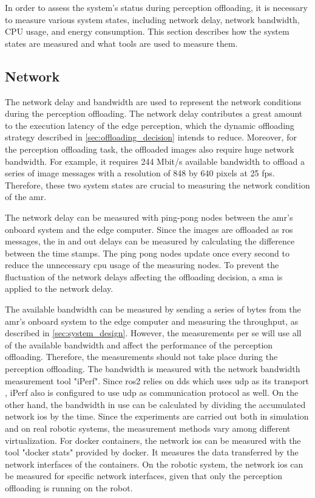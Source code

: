 In order to assess the system's status during perception offloading, it is necessary to measure various system states, including network delay, network bandwidth, CPU usage, and energy consumption. This section describes how the system states are measured and what tools are used to measure them. 

\subsection{Network}

The network delay and bandwidth are used to represent the network conditions during the perception offloading. The network delay contributes a great amount to the execution latency of the edge perception, which the dynamic offloading strategy described in \cref{sec:offloading_decision} intends to reduce. Moreover, for the perception offloading task, the offloaded images also require huge network bandwidth. For example, it requires 244 Mbit/s available bandwidth to offload a series of image messages with a resolution of 848 by 640 pixels at 25 \gls{fps}. Therefore, these two system states are crucial to measuring the network condition of the \gls{amr}.

The network delay can be measured with ping-pong nodes between the \gls{amr}'s onboard system and the edge computer. Since the images are offloaded as \gls{ros} messages, the in and out delays can be measured by calculating the difference between the time stamps. The ping pong nodes update once every second to reduce the unnecessary \gls{cpu} usage of the measuring nodes. To prevent the fluctuation of the network delays affecting the offloading decision, a \gls{sma} is applied to the network delay. 

The available bandwidth can be measured by sending a series of bytes from the \gls{amr}'s onboard system to the edge computer and measuring the throughput, as described in \cref{sec:system_design}. However, the measurements per se will use all of the available bandwidth and affect the performance of the perception offloading. Therefore, the measurements should not take place during the perception offloading. The bandwidth is measured with the network bandwidth measurement tool "iPerf". Since \gls{ros}2 relies on \gls{dds} which uses \gls{udp} as its transport \cite{Macenski2022}, iPerf also is configured to use \gls{udp} as communication protocol as well. On the other hand, the bandwidth in use can be calculated by dividing the accumulated network \glspl{io} by the time. Since the experiments are carried out both in simulation and on real robotic systems, the measurement methods vary among different virtualization. For \gls{docker} containers, the network \glspl{io} can be measured with the tool "docker stats" provided by \gls{docker}. It measures the data transferred by the network interfaces of the containers. On the robotic system, the network \glspl{io} can be measured for specific network interfaces, given that only the perception offloading is running on the robot.

